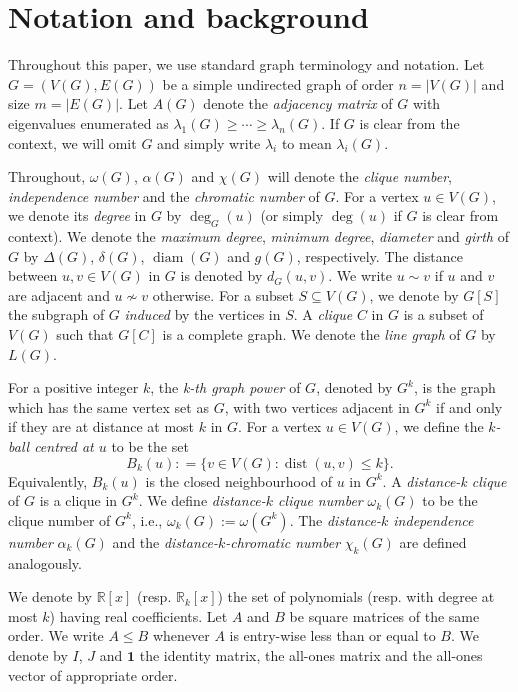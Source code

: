 \documentclass[10pt,a4paper]{article}
\theoremstyle{plain}
\numberwithin{equation}{section}
\DeclareMathOperator{\diam}{diam}
\DeclareMathOperator{\dist}{dist}
\begin{document}
\section{Notation and background}
Throughout this paper, we use standard graph terminology and notation. Let $G=(V(G), E(G))$ be a simple undirected graph of order $n = |V(G)|$ and size $m = |E(G)|$. Let $A(G)$ denote the \emph{adjacency matrix} of $G$ with eigenvalues enumerated as $\lambda_{1}(G)\geq \cdots \geq \lambda_{n}(G)$. If $G$ is clear from the context, we will omit $G$ and simply write $\lambda_i$ to mean $\lambda_i(G)$. 

Throughout, $\omega(G)$, $\alpha(G)$ and $\chi(G)$ will denote the \emph{clique number}, \emph{independence number} and the \emph{chromatic number} of $G$. For a vertex $u\in V(G)$, we denote its \emph{degree} in $G$ by $\deg_G(u)$ (or simply $\deg(u)$ if $G$ is clear from context). We denote the \emph{maximum degree}, \emph{minimum degree}, \emph{diameter} and \emph{girth} of $G$ by $\Delta(G)$, $\delta(G)$, $\diam(G)$ and $g(G)$, respectively. The distance between $u,v\in V(G)$ in $G$ is denoted by $d_G(u,v)$. We write $u\sim v$ if $u$ and $v$ are adjacent and $u\nsim v$ otherwise. For a subset $S\subseteq V(G)$, we denote by $G[S]$ the subgraph of $G$ \emph{induced} by the vertices in $S$. A \emph{clique} $C$ in $G$ is a subset of $V(G)$ such that $G[C]$ is a complete graph. We denote the \emph{line graph} of $G$ by $L(G)$. 

For a positive integer $k$, the \emph{k-th graph power} of $G$, denoted by $G^k$, is the graph which has the same vertex set as $G$, with two vertices adjacent in $G^k$ if and only if they are at distance at most $k$ in $G$. For a vertex $u\in V(G)$, we define the \emph{$k$-ball centred at $u$} to be the set \[ B_k(u): = \{v\in V(G): \dist(u,v)\le k\}.\] Equivalently, $B_k(u)$ is the closed neighbourhood of $u$ in $G^k$. A \emph{distance-k clique} of $G$ is a clique in $G^k$. We define \emph{distance-$k$ clique number} $\omega_k(G)$ to be the clique number of $G^k$, i.e., $\omega_k(G):=\omega(G^k)$. The \emph{distance-$k$ independence number} $\alpha_k(G)$ and the \emph{distance-$k$-chromatic number} $\chi_k(G)$ are defined analogously. 

We denote by $\mathbb{R}[x]$ (resp. $\mathbb{R}_k[x]$) the set of polynomials (resp. with degree at most $k$) having real coefficients. Let $A$ and $B$ be square matrices of the same order. We write $A\le B$ whenever $A$ is entry-wise less than or equal to $B$. We denote by $I$, $J$ and $\mathbf{1}$ the identity matrix, the all-ones matrix and the all-ones vector of appropriate order. 
\end{document}
